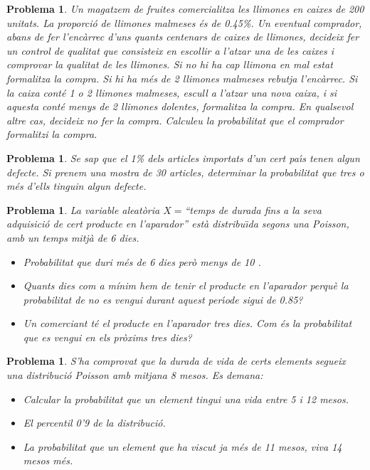 \documentclass[11pt]{article}
\newcounter{prbcont}
\newtheorem{problema}[prbcont]{Problema}
\newcommand{\sol}[1]{{\textbf{\footnotetext[\the\problemes]{Sol.: #1} }}}
\begin{document}

\begin{problema}
Un magatzem de fruites comercialitza les llimones en caixes de 200 unitats. La proporci\'o
de llimones malmeses \'es de 0.45\%. Un eventual comprador, abans de fer l'enc\`arrec
d'uns quants centenars de caixes de llimones, decideix fer un control de qualitat que
consisteix en escollir a l'atzar una de les caixes i comprovar la qualitat de les llimones.
Si no hi ha cap llimona en mal estat formalitza la compra. Si hi ha m\'es de 2 llimones
malmeses rebutja l'enc\`arrec. Si la caixa cont\'e 1 o 2 llimones malmeses, escull a l'atzar
una nova caixa, i si aquesta cont\'e menys de 2 llimones dolentes, formalitza la compra.
En qualsevol altre cas, decideix no fer la compra. Calculeu la probabilitat que el
comprador formalitzi la compra. %
\end{problema}



\begin{problema}
Se sap que el 1\% dels articles importats d'un cert pa\'{\i}s tenen algun defecte. Si prenem una mostra de 30 articles, determinar la probabilitat que tres o m\'es d'ells tinguin algun defecte. %
\end{problema}

\begin{problema}
La variable aleat\`oria $X=$``temps de durada fins a la seva adquisici\'o de cert producte en l'aparador'' est\`a distribu\"{\i}da segons una Poisson, amb un temps mitj\`a de 6 dies. 
\begin{itemize}
\item Probabilitat que duri m\'es de 6 dies per\`o menys de 10 . 
\item Quants dies com a m\'{i}nim hem de tenir el producte en l'aparador perqu\`e la probabilitat de no es vengui durant aquest per\'{\i}ode sigui de 0.85? 
\item Un comerciant t\'e el producte en l'aparador tres dies. Com \'es la probabilitat que es vengui en  els pr\`oxims tres dies? %
\end{itemize}
\end{problema}

\begin{problema}
S'ha comprovat que la durada de vida de certs elements segueix una distribuci\'o Poisson amb mitjana 8 mesos. Es demana: 
\begin{itemize}
\item Calcular la probabilitat que un element tingui una vida entre 5 i 12 mesos. 
\item El percentil 0'9 de la distribuci\'o. 
\item La probabilitat que un element que ha viscut ja m\'es de 11 mesos, viva 14 mesos m\'es. 
\end{itemize}%
\end{problema}
\end{document}
